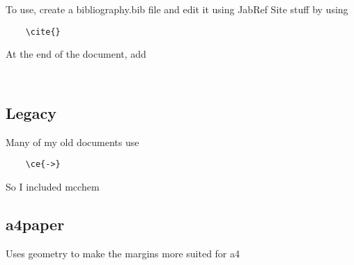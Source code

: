 \documentclass{article}
\begin{document}
To use, create a bibliography.bib file and edit it using JabRef
Site stuff by using 
\begin{verbatim}
	\cite{}
\end{verbatim}
At the end of the document, add 
\begin{verbatim}
	
\end{verbatim}

\subsection{Legacy}

Many of my old documents use 

\begin{verbatim}
	\ce{->}
\end{verbatim}

So I included mcchem

\subsection{a4paper}

Uses geometry to make the margins more suited for a4
\end{document}
